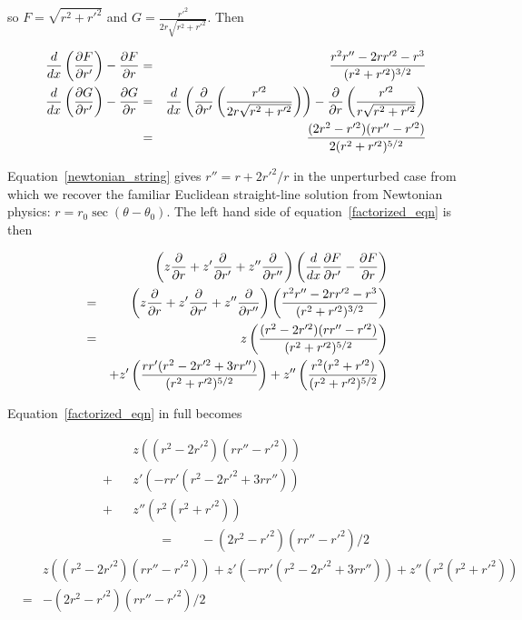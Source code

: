 \documentclass[pdflatex,sn-mathphys-num]{sn-jnl}%
\theoremstyle{thmstyleone}%
\theoremstyle{thmstyletwo}%
\theoremstyle{thmstylethree}%
\begin{document}
so $F=\sqrt{r^2+r'^2}$ and $G=\frac{r'^2}{2r\sqrt{r^2+r'^2}}$.  Then

\begin{eqnarray}\label{newtonian_string}
\frac{d}{dx}\left(\frac{\partial{F}}{\partial{r'}}\right) -\frac{\partial{F}}{\partial{r}} &=& \frac{r^2r''- 2rr'^2 -r^3}{(r^2 +r'^2)^{3/2}}\\
\frac{d}{dx}\left(\frac{\partial{G}}{\partial{r'}}\right) -\frac{\partial{G}}{\partial{r}} &=&
\frac{d}{dx}\left(\frac{\partial}{\partial r'}\left(\frac{r'^2}{2r\sqrt{r^2+r'^2}}\right)\right)
- \frac{\partial}{\partial
  r}\left(\frac{r'^2}{r\sqrt{r^2+r'^2}}\right)\nonumber\\
&=& \frac{(2r^2-r'^2)(rr''-r'^2)}{2(r^2+r'^2)^{5/2}}
\end{eqnarray}

Equation~\ref{newtonian_string} gives $r'' = r + 2r'^2/r$ in the
unperturbed case from which we recover the familiar Euclidean
straight-line solution from Newtonian physics:
$r=r_0\sec(\theta-\theta_0)$.  The left hand side of
equation~\ref{factorized_eqn} is then

\begin{eqnarray}
&{}& \left(z\frac{\partial{}}{\partial{r}} + z'\frac{\partial{}}{\partial{r'}} + z''\frac{\partial{}}{\partial{r''}}\right)
\left(\frac{d}{dx}\frac{\partial{F}}{\partial{r'}}
-\frac{\partial{F}}{\partial{r}}\right)\nonumber\\
&=&  \left(z\frac{\partial{}}{\partial{r}} + z'\frac{\partial{}}{\partial{r'}} + z''\frac{\partial{}}{\partial{r''}}\right)
\left(\frac{r^2r''- 2rr'^2 -r^3}{(r^2 +r'^2)^{3/2}}\right)\nonumber\\
&=& 
 z  \left(\frac{(r^2 - 2r'^2)(rr''-r'^2)}{(r^2 + r'^2)^{5/2}}\right)\nonumber\\
 &{}& + z' \left(\frac{rr'(r^2 - 2r'^2 + 3rr'')}{(r^2 + r'^2)^{5/2}}\right)
      + z''\left(\frac{r^2    (r^2+r'^2)       }{(r^2 + r'^2)^{5/2}}\right)
\end{eqnarray}

Equation~\ref{factorized_eqn} in full becomes

\begin{eqnarray}
 &{}&z   \left((r^2 - 2r'^2)(rr''-r'^2)\right)\nonumber\\
+&{}&z'  \left(-rr'(r^2 - 2r'^2 + 3rr'')\right)\nonumber\\
+&{}&z'' \left(r^2    (r^2+r'^2)       \right)\nonumber\\
&{}&\qquad =\qquad -(2r^2-r'^2)(rr''-r'^2)/2
\end{eqnarray}
\begin{eqnarray}
  &{}&
  z   \left((r^2 - 2r'^2)(rr''-r'^2)\right)
  +z'  \left(-rr'(r^2 - 2r'^2 + 3rr'')\right)
  +z'' \left(r^2    (r^2+r'^2)       \right)\nonumber\\
 &=& -(2r^2-r'^2)(rr''-r'^2)/2
\end{eqnarray}
\end{document}
